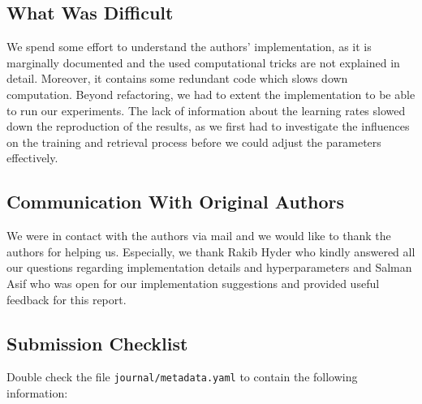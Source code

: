 \subsection*{What Was Difficult}


We spend some effort to understand the authors' implementation, as it is marginally documented and the used computational tricks are not explained in detail. Moreover, it contains some redundant code which slows down computation. Beyond refactoring, we had to extent the implementation to be able to run our experiments. The lack of information about the learning rates slowed down the reproduction of the results, as we first had to investigate the influences on the training and retrieval process before we could adjust the parameters effectively.

\subsection*{Communication With Original Authors}


We were in contact with the authors via mail and we would like to
thank the authors for helping us.  Especially, we thank Rakib Hyder
who kindly answered all our questions regarding implementation details
and hyperparameters and Salman Asif who was open for our
implementation suggestions and provided useful feedback for this
report.



\subsection{Submission Checklist}

Double check the file \texttt{journal/metadata.yaml} to contain the following information:

